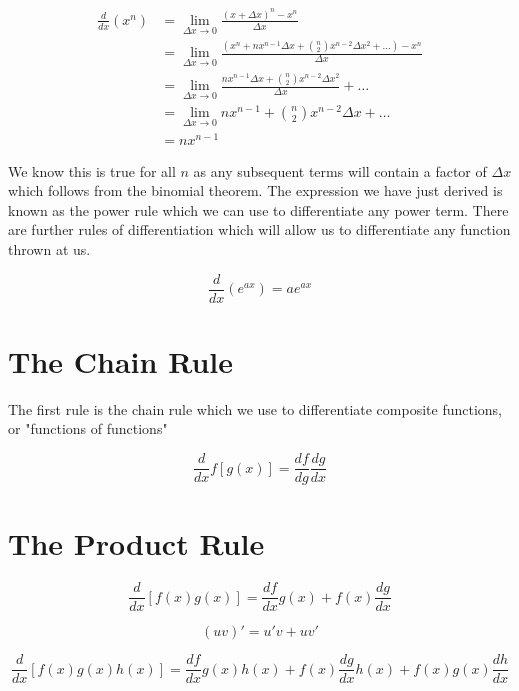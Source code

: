 \begin{align*}
    \frac{d}{dx}(x^{n}) &= \lim_{\Delta x \to 0} \frac{(x + \Delta x)^{n} - x^{n}}{\Delta x}\\
    &= \lim_{\Delta x \to 0} \frac{(x^{n} + n x^{n-1}\Delta x + \binom{n}{2}x^{n-2}\Delta x^{2} +\dots) - x^{n}}{\Delta x}\\
    &= \lim_{\Delta x \to 0} \frac{n x^{n-1}\Delta x + \binom{n}{2}x^{n-2}\Delta x^{2}}{\Delta x} + \dots\\
    &= \lim_{\Delta x \to 0} n x^{n-1} + \binom{n}{2}x^{n-2}\Delta x + \dots\\
    &= n x^{n-1}
\end{align*}

We know this is true for all $n$ as any subsequent terms will contain a factor of $\Delta x$ which 
follows from the binomial theorem. The expression we have just derived is known as the power rule
which we can use to differentiate any power term. There are further rules of differentiation which
will allow us to differentiate any function thrown at us.

\begin{equation*}
    \frac{d}{dx}(e^{ax}) = ae^{ax}
\end{equation*}

\section{The Chain Rule}

The first rule is the chain rule which we use to differentiate composite functions, or "functions
of functions"

\begin{equation*}
    \frac{d}{dx}f[g(x)] = \frac{df}{dg} \frac{dg}{dx}
\end{equation*}

\section{The Product Rule}

\begin{equation*}
    \frac{d}{dx} \left[f(x)g(x)\right] = \frac{df}{dx} g(x) + f(x)\frac{dg}{dx}
\end{equation*}

\begin{equation*}
    (uv)' = u' v + uv'
\end{equation*}

\begin{equation*}
    \frac{d}{dx} \left[f(x)g(x)h(x)\right] = \frac{df}{dx} g(x)h(x) + f(x)\frac{dg}{dx} h(x) + f(x)g(x) \frac{dh}{dx}
\end{equation*}

